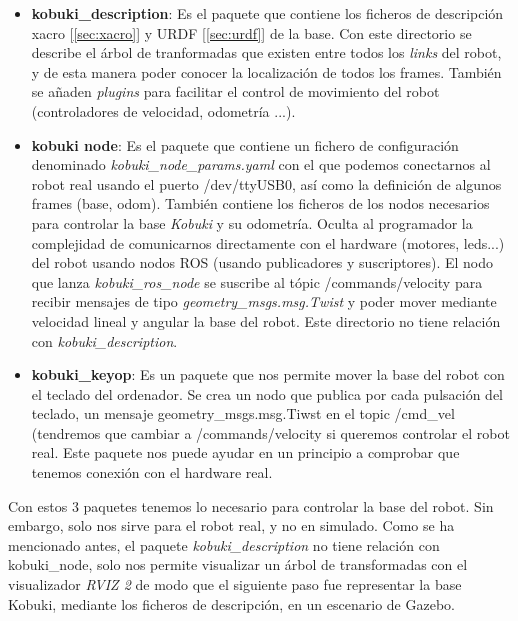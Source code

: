 \begin{itemize}
	\item \textbf{kobuki\_description}: Es el paquete que contiene los ficheros de descripción xacro [\ref{sec:xacro}] y URDF [\ref{sec:urdf}] de la base. Con este directorio se describe el árbol de tranformadas que existen entre todos los \textit{links} del robot, y de esta manera poder conocer la localización de todos los frames. También se añaden \textit{plugins} para facilitar el control de movimiento del robot (controladores de velocidad, odometría ...).
	\item \textbf{kobuki node}: Es el paquete que contiene un fichero de configuración denominado \textit{kobuki\_node\_params.yaml} con el que podemos conectarnos al robot real usando el puerto /dev/ttyUSB0, así como la definición de algunos frames (base, odom). También contiene los ficheros de los nodos necesarios para controlar la base \textit{Kobuki} y su odometría. Oculta al programador la complejidad de comunicarnos directamente con el hardware (motores, leds...) del robot usando nodos ROS (usando publicadores y suscriptores). El nodo que lanza \textit{kobuki\_ros\_node} se suscribe al tópic /commands/velocity para recibir mensajes de tipo \textit{geometry\_msgs.msg.Twist} y poder mover mediante velocidad lineal y angular la base del robot. Este directorio no tiene relación con \textit{kobuki\_description}.
	\item \textbf{kobuki\_keyop}: Es un paquete que nos permite mover la base del robot con el teclado del ordenador. Se crea un nodo que publica por cada pulsación del teclado, un mensaje geometry\_msgs.msg.Tiwst en el topic /cmd\_vel (tendremos que cambiar a /commands/velocity si queremos controlar el robot real. Este paquete nos puede ayudar en un principio a comprobar que tenemos conexión con el hardware real.
\end{itemize}

Con estos 3 paquetes tenemos lo necesario para controlar la base del robot. Sin embargo, solo nos sirve para el robot real, y no en simulado. Como se ha mencionado antes, el paquete \textit{kobuki\_description} no tiene relación con kobuki\_node, solo nos permite visualizar un árbol de transformadas con el visualizador \textit{RVIZ 2} de modo que el siguiente paso fue representar la base Kobuki, mediante los ficheros de descripción, en un escenario de Gazebo.\\




